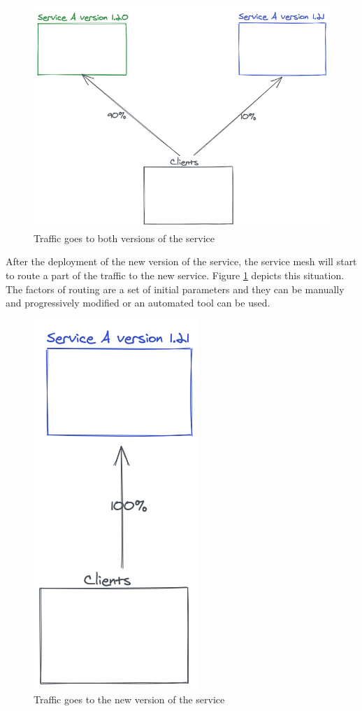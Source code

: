 \documentclass[conference]{IEEEtran}
\begin{document}
    \begin{figure}
        \centering
        \includegraphics[scale=0.25]{traffic9010.png}
        \caption{Traffic goes to both versions of the service}
        \label{fig:traffic9010}
    \end{figure}

    After the deployment of the new version of the service, the service mesh will start to route a part of the traffic to the new service. Figure \ref{fig:traffic9010} depicts this situation. The factors of routing are a set of initial parameters and they can be manually and progressively modified or an automated tool can be used.

    \begin{figure}
        \centering
        \includegraphics[scale=0.25]{traffic100new.png}
        \caption{Traffic goes to the new version of the service}
        \label{fig:traffic100new}
    \end{figure}
\end{document}
